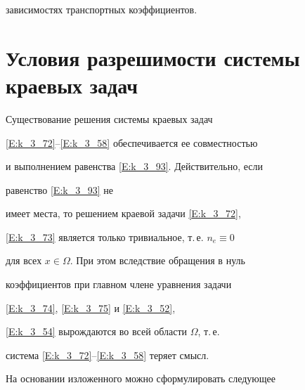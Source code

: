 зависимостях транспортных коэффициентов.








\section{Условия разрешимости системы краевых задач}





Существование решения системы краевых задач


\eqref{E:k_3_72}--\eqref{E:k_3_58} обеспечивается ее совместностью


и выполнением равенства \eqref{E:k_3_93}. Действительно, если


равенство \eqref{E:k_3_93} не


имеет места, то решением краевой задачи \eqref{E:k_3_72},


\eqref{E:k_3_73} является только тривиальное, т.\,е. $n_e\equiv 0$


для всех $x \in \Omega$. При этом вследствие обращения в нуль


коэффициентов при главном члене уравнения задачи


\eqref{E:k_3_74}, \eqref{E:k_3_75} и \eqref{E:k_3_52},


\eqref{E:k_3_54} вырождаются во всей области $\Omega$, т.\,е.


система \eqref{E:k_3_72}--\eqref{E:k_3_58} теряет смысл.





На основании изложенного можно сформулировать следующее





